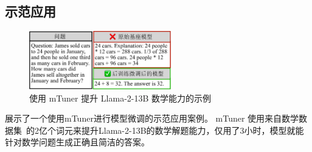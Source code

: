 \subsection{示范应用}

\begin{figure}[ht]
\centerline{\includegraphics[width=0.55\textwidth]{figures/mtuner/exp-img/demo-crop.pdf}}
\caption{使用 mTuner 提升 Llama-2-13B 数学能力的示例}
\label{fig:eval-demo}
\end{figure}

展示了一个使用mTuner进行模型微调的示范应用案例。  
mTuner 使用来自数学数据集~\cite{math-datatset}的2亿个词元来提升Llama-2-13B的数学解题能力，仅用了3小时，模型就能针对数学问题生成正确且简洁的答案。

